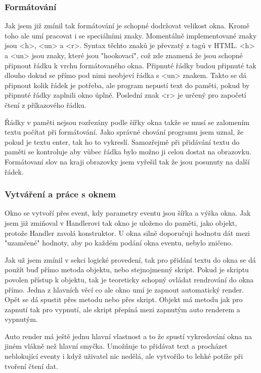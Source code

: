 \documentclass[12pt,a4paper]{article}
\begin{document}
\subsubsection{Formátování}
Jak jsem již zmínil tak formátování je schopné dodržovat velikost okna. Kromě toho ale umí pracovat i se speciálními znaky. Momentálně implementované znaky jsou <h>, <un> a <r>. Syntax těchto znaků je převzatý z tagů v HTML. <h> a <un> jsou znaky, které jsou "hookovací", což zde znamená že jsou schopné připnout řádku k vrchu formátovaného okna. Připnuté řádky budou připnuté tak dlouho dokud se přímo pod nimi neobjeví řádka s <un> znakem. Takto se dá připnout kolik řádek je potřeba, ale program nepustí text do paměti, pokud by připnuté řádky zaplnili okno úplně. Poslední znak <r> je určený pro započetí čtení z příkazového řádku.

Řádky v paměti nejsou rozřezány podle šířky okna takže se musí se zalomením textu počítat při formátování. Jako správné chování programu jsem uznal, že pokud je textu enter, tak ho to vykreslí. Samozřejmě při přidávání textu do paměti se kontroluje aby vůbec řádka bylo možno ji celou dostat na obrazovku. Formátovaní slov na kraji obrazovky jsem vyřešil tak že jsou posunuty na další řádek.
\subsubsection{Vytváření a práce s oknem}
Okno se vytvoří přes event, kdy parametry eventu jsou šířka a výška okna. Jak jsem již zmiňoval v Handlerovi tak okno je uloženo do paměti, jako objekt, protože Handler zavolá konstruktor. U okna silně doporučuji hodnotu dát mezi "uzamčené" hodnoty, aby po každém podání okna eventu, nebylo zničeno.

Jak už jsem zmínil v sekci logické provedení, tak pro přidání textu do okna se dá použít buď přímo metoda objektu, nebo stejnojmenný skript. Pokud je skriptu povolen přístup k objektu, tak je teoreticky schopný ovládat rendrování do okna přímo. Jedna z hlavních věcí co ale okno umí je zapnout automatický render. Opět se dá spustit přes metodu nebo přes skript. Objekt má metodu jak pro zapnutí tak pro vypnutí, ale skript přepíná mezi zapnutým auto renderem a vypnutým. 

Auto render má ještě jednu hlavní vlastnost a to že spustí vykreslování okna na jiném vlákně než hlavní smyčka. Umožňuje to přidávat text a procházet neblokující eventy i když uživatel nic nedělá, ale vytvořilo to lehké potíže při tvoření čtení dat.
\end{document}
